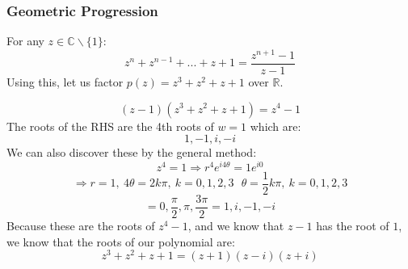 \documentclass[12pt]{report}
\begin{document}
\begin{flushleft}
\subsubsection*{Geometric Progression}
For any \(z \in \mathbb{C} \backslash \{1\}\):
\[z^n + z^{n - 1} + ... + z + 1 = \frac{z^{n + 1} - 1}{z - 1}\]
Using this, let us factor \(p(z) = z^3 + z^2 + z + 1\) over \(\mathbb{R}\).
\begin{center}
    \[(z - 1)(z^3 + z^2 + z + 1) = z^4 - 1\]
    The roots of the RHS are the 4th roots of \(w = 1\) which are:
    \[1, -1, i, -i\]
    We can also discover these by the general method:
    \[z^4 = 1 \Rightarrow r^4e^{i4\theta} = 1e^{i0}\]
    \[\Rightarrow r = 1,\: 4\theta = 2k\pi,\: k = 0, 1, 2, 3 \:\:\: \theta = \frac{1}{2}k\pi,\: k = 0, 1, 2, 3\]
    \[= 0, \frac{\pi}{2}, \pi, \frac{3\pi}{2} = 1, i, -1, -i\]
    Because these are the roots of \(z^4 - 1\), and we know that \(z - 1\) has
    the root of \(1\), we know that the roots of our polynomial are:
    \[z^3 + z^2 + z + 1 = (z + 1)(z - i)(z + i)\]

\end{center}
\end{flushleft}
\end{document}
